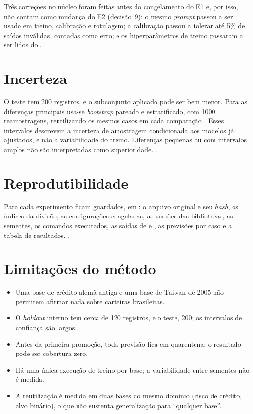Três correções no núcleo foram feitas antes do congelamento do E1 e, por isso, não contam como mudança do E2 (decisão~9): o mesmo \emph{prompt} passou a ser usado em treino, calibração e rotulagem; a calibração passou a tolerar até 5\% de saídas inválidas, contadas como erro; e os hiperparâmetros de treino passaram a ser lidos do .

\section{Incerteza}

O teste tem 200 registros, e o subconjunto aplicado pode ser bem menor. Para as diferenças principais usa-se \emph{bootstrap} pareado e estratificado, com 1000 reamostragens, reutilizando os mesmos casos em cada comparação \cite{efron1993}. Esses intervalos descrevem a incerteza de amostragem condicionada aos modelos já ajustados, e não a variabilidade do treino. Diferenças pequenas ou com intervalos amplos não são interpretadas como superioridade. .

\section{Reprodutibilidade}

Para cada experimento ficam guardados, em : o arquivo original e seu \emph{hash}, os índices da divisão, as configurações congeladas, as versões das bibliotecas, as sementes, os comandos executados, as saídas de  e , as previsões por caso e a tabela de resultados. .

\section{Limitações do método}

\begin{itemize}
  \item Uma base de crédito alemã antiga e uma base de Taiwan de 2005 não permitem afirmar nada sobre carteiras brasileiras.
  \item O \emph{holdout} interno tem cerca de 120 registros, e o teste, 200; os intervalos de confiança são largos.
  \item Antes da primeira promoção, toda previsão fica em quarentena; o resultado pode ser cobertura zero.
  \item Há uma única execução de treino por base; a variabilidade entre sementes não é medida.
  \item A reutilização é medida em duas bases do mesmo domínio (risco de crédito, alvo binário), o que não sustenta generalização para ``qualquer base''.
\end{itemize}
